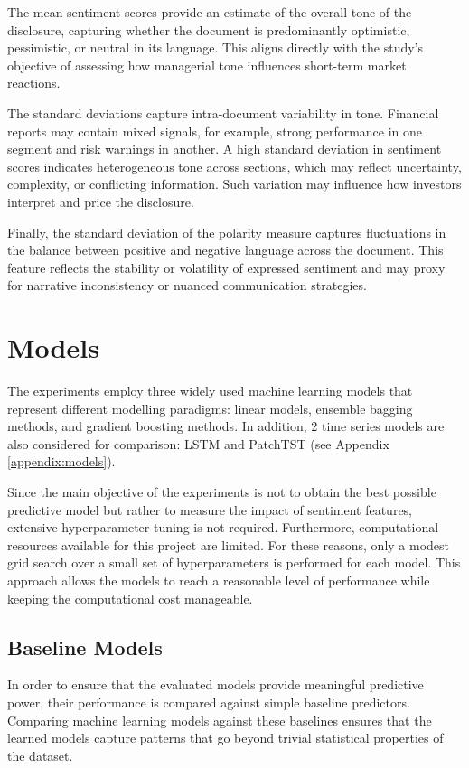 The mean sentiment scores provide an estimate of the overall tone of the disclosure, capturing whether the document is predominantly optimistic, pessimistic, or neutral in its language. 
This aligns directly with the study's objective of assessing how managerial tone influences short-term market reactions.

The standard deviations capture intra-document variability in tone. 
Financial reports may contain mixed signals, for example, strong performance in one segment and risk warnings in another. 
A high standard deviation in sentiment scores indicates heterogeneous tone across sections, which may reflect uncertainty, complexity, or conflicting information. 
Such variation may influence how investors interpret and price the disclosure.

Finally, the standard deviation of the polarity measure captures fluctuations in the balance between positive and negative language across the document. 
This feature reflects the stability or volatility of expressed sentiment and may proxy for narrative inconsistency or nuanced communication strategies.

\section{Models}

The experiments employ three widely used machine learning models that represent different modelling paradigms: linear models, ensemble bagging methods, and gradient boosting methods.
In addition, 2 time series models are also considered for comparison: LSTM and PatchTST (see Appendix \ref{appendix:models}).

Since the main objective of the experiments is not to obtain the best possible predictive model but rather to measure the impact of sentiment features, extensive hyperparameter tuning is not required.
Furthermore, computational resources available for this project are limited. For these reasons, only a modest grid search over a small set of hyperparameters is performed for each model.
This approach allows the models to reach a reasonable level of performance while keeping the computational cost manageable.

\subsection{Baseline Models}

In order to ensure that the evaluated models provide meaningful predictive power, their performance is compared against simple baseline predictors.
Comparing machine learning models against these baselines ensures that the learned models capture patterns that go beyond trivial statistical properties of the dataset.

